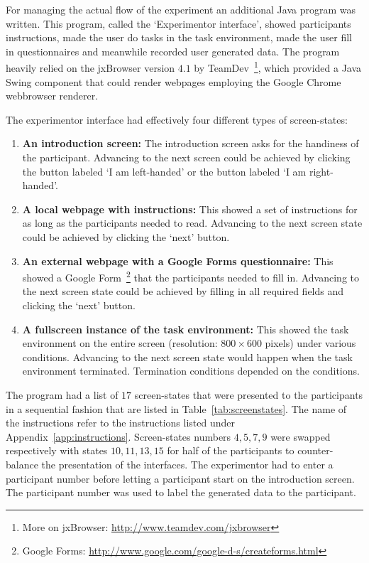 For managing the actual flow of the experiment an additional Java program was written. This program, called the `Experimentor interface', showed participants instructions, made the user do tasks in the task environment, made the user fill in questionnaires and meanwhile recorded user generated data. The program heavily relied on the jxBrowser version $4.1$ by TeamDev~\footnote{More on jxBrowser: \url{http://www.teamdev.com/jxbrowser}}, which provided a Java Swing component that could render webpages employing the Google Chrome webbrowser renderer. 

The experimentor interface had effectively four different types of screen-states:
\begin{enumerate}
	\item{\textbf{An introduction screen:}} The introduction screen asks for the handiness of the participant. Advancing to the next screen could be achieved by clicking the button labeled `I am left-handed' or the button labeled `I am right-handed'. 
	\item{\textbf{A local webpage with instructions:}} This showed a set of instructions for as long as the participants needed to read. Advancing to the next screen state could be achieved by clicking the `next' button. 
	\item{\textbf{An external webpage with a Google Forms questionnaire:}} This showed a Google Form~\footnote{Google Forms: \url{http://www.google.com/google-d-s/createforms.html}} that the participants needed to fill in. Advancing to the next screen state could be achieved by filling in all required fields and clicking the `next' button.
	\item{\textbf{A fullscreen instance of the task environment:}} This showed the task environment on the entire screen (resolution: $800 \times 600$ pixels) under various conditions. Advancing to the next screen state would happen when the task environment terminated. Termination conditions depended on the conditions.
\end{enumerate}

\noindent The program had a list of $17$ screen-states that were presented to the participants in a sequential fashion that are listed in Table~\ref{tab:screenstates}. The name of the instructions refer to the instructions listed under Appendix~\ref{app:instructions}. Screen-states numbers $4,5,7,9$ were swapped respectively with states $10,11,13,15$ for half of the participants to counter-balance the presentation of the interfaces. The experimentor had to enter a participant number before letting a participant start on the introduction screen. The participant number was used to label the generated data to the participant. 


